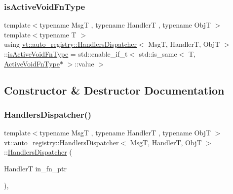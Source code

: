 \mbox{\label{structvt_1_1auto__registry_1_1_handlers_dispatcher_add4a5deacd38de5f66c799d6c2b6b62a}} 
\subsubsection{\texorpdfstring{is\+Active\+Void\+Fn\+Type}{isActiveVoidFnType}}
{\footnotesize\ttfamily template$<$typename MsgT , typename HandlerT , typename ObjT $>$ \\
template$<$typename T $>$ \\
using \hyperlink{structvt_1_1auto__registry_1_1_handlers_dispatcher}{vt\+::auto\+\_\+registry\+::\+Handlers\+Dispatcher}$<$ MsgT, HandlerT, ObjT $>$\+::\hyperlink{structvt_1_1auto__registry_1_1_handlers_dispatcher_add4a5deacd38de5f66c799d6c2b6b62a}{is\+Active\+Void\+Fn\+Type} =  std\+::enable\+\_\+if\+\_\+t$<$ std\+::is\+\_\+same$<$ T, \hyperlink{namespacevt_ad0569ad32e87f0c5fb53fccd669f8dfa}{Active\+Void\+Fn\+Type}$\ast$ $>$\+::value $>$\hspace{0.3cm}{\ttfamily [private]}}



\subsection{Constructor \& Destructor Documentation}
\mbox{\label{structvt_1_1auto__registry_1_1_handlers_dispatcher_aea820469903ae2c06a6e9934d3e8d0cc}} 
\subsubsection{\texorpdfstring{Handlers\+Dispatcher()}{HandlersDispatcher()}}
{\footnotesize\ttfamily template$<$typename MsgT , typename HandlerT , typename ObjT $>$ \\
\hyperlink{structvt_1_1auto__registry_1_1_handlers_dispatcher}{vt\+::auto\+\_\+registry\+::\+Handlers\+Dispatcher}$<$ MsgT, HandlerT, ObjT $>$\+::\hyperlink{structvt_1_1auto__registry_1_1_handlers_dispatcher}{Handlers\+Dispatcher} (\begin{DoxyParamCaption}\item[{HandlerT}]{in\+\_\+fn\+\_\+ptr }\end{DoxyParamCaption})\hspace{0.3cm}{\ttfamily [inline]}, {\ttfamily [explicit]}}




